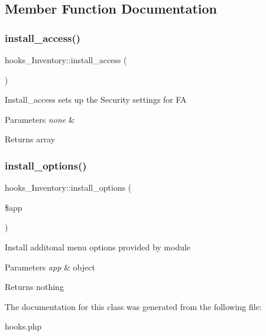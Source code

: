 \subsection{Member Function Documentation}
\hypertarget{classhooks___inventory_ab5c9c0ba2bcb53683571ff27ab5000dd}{}\label{classhooks___inventory_ab5c9c0ba2bcb53683571ff27ab5000dd} 
\subsubsection{\texorpdfstring{install\+\_\+access()}{install\_access()}}
{\footnotesize\ttfamily hooks\+\_\+\+Inventory\+::install\+\_\+access (\begin{DoxyParamCaption}{ }\end{DoxyParamCaption})}

Install\+\_\+access sets up the Security settings for FA 
\begin{DoxyParams}{Parameters}
{\em none} & \\
\hline
\end{DoxyParams}
\begin{DoxyReturn}{Returns}
array 
\end{DoxyReturn}
\hypertarget{classhooks___inventory_a92994ac980fa7a6e8256e12c999cde84}{}\label{classhooks___inventory_a92994ac980fa7a6e8256e12c999cde84} 
\subsubsection{\texorpdfstring{install\+\_\+options()}{install\_options()}}
{\footnotesize\ttfamily hooks\+\_\+\+Inventory\+::install\+\_\+options (\begin{DoxyParamCaption}\item[{}]{\$app }\end{DoxyParamCaption})}

Install additonal menu options provided by module 
\begin{DoxyParams}{Parameters}
{\em app} & object \\
\hline
\end{DoxyParams}
\begin{DoxyReturn}{Returns}
nothing 
\end{DoxyReturn}


The documentation for this class was generated from the following file\+:\begin{DoxyCompactItemize}
\item 
hooks.\+php\end{DoxyCompactItemize}
